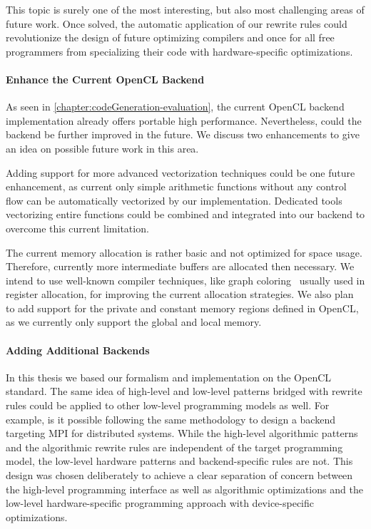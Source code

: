 \bigskip
This topic is surely one of the most interesting, but also most challenging areas of future work.
Once solved, the automatic application of our rewrite rules could revolutionize the design of future optimizing compilers and once for all free programmers from specializing their code with hardware-specific optimizations.

\paragraph{Enhance the Current OpenCL Backend}
As seen in \autoref{chapter:codeGeneration-evaluation}, the current OpenCL backend implementation already offers portable high performance.
Nevertheless, could the backend be further improved in the future.
We discuss two enhancements to give an idea on possible future work in this area.

Adding support for more advanced vectorization techniques could be one future enhancement, as current only simple arithmetic functions without any control flow can be automatically vectorized by our implementation.
Dedicated tools vectorizing entire functions could be combined and integrated into our backend to overcome this current limitation.

The current memory allocation is rather basic and not optimized for space usage.
Therefore, currently more intermediate buffers are allocated then necessary.
We intend to use well-known compiler techniques, like graph coloring~\cite{Muchnick1997} usually used in register allocation, for improving the current allocation strategies.
We also plan to add support for the private and constant memory regions defined in OpenCL, as we currently only support the global and local memory.

\paragraph{Adding Additional Backends}
In this thesis we based our formalism and implementation on the OpenCL standard.
The same idea of high-level and low-level patterns bridged with rewrite rules could be applied to other low-level programming models as well.
For example, is it possible following the same methodology to design a backend targeting MPI for distributed systems.
While the high-level algorithmic patterns and the algorithmic rewrite rules are independent of the target programming model, the low-level hardware patterns and  backend-specific rules are not.
This design was chosen deliberately to achieve a clear separation of concern between the high-level programming interface as well as algorithmic optimizations and the low-level hardware-specific programming approach with device-specific optimizations.

